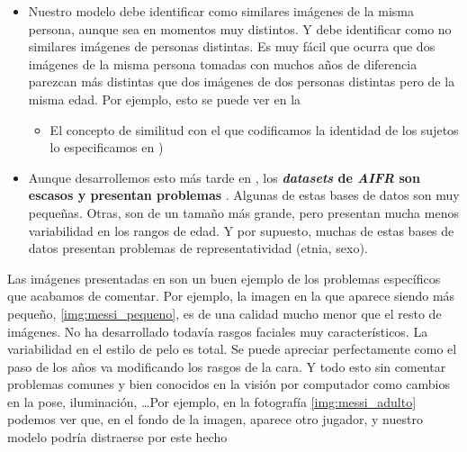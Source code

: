 \begin{itemize}
\item Nuestro modelo debe identificar como similares imágenes de la misma persona, aunque sea en momentos muy distintos. Y debe identificar como no similares imágenes de personas distintas. Es muy fácil que ocurra que dos imágenes de la misma persona tomadas con muchos años de diferencia parezcan más distintas que dos imágenes de dos personas distintas pero de la misma edad. Por ejemplo, esto se puede ver en la 
    \begin{itemize}
        \item El concepto de similitud con el que codificamos la identidad de los sujetos lo especificamos en )
    \end{itemize}
\item Aunque desarrollemos esto más tarde en , los \textbf{\textit{datasets} de \textit{AIFR} son escasos y presentan problemas} \cite{informatica:tecnica_sintesis_aifr}. Algunas de estas bases de datos son muy pequeñas. Otras, son de un tamaño más grande, pero presentan mucha menos variabilidad en los rangos de edad. Y por supuesto, muchas de estas bases de datos presentan problemas de representatividad (etnia, sexo).
\end{itemize}

Las imágenes presentadas en  son un buen ejemplo de los problemas específicos que acabamos de comentar. Por ejemplo, la imagen en la que aparece siendo más pequeño, \ref{img:messi_pequeno}, es de una calidad mucho menor que el resto de imágenes. No ha desarrollado todavía rasgos faciales muy característicos. La variabilidad en el estilo de pelo es total. Se puede apreciar perfectamente como el paso de los años va modificando los rasgos de la cara. Y todo esto sin comentar problemas comunes y bien conocidos en la visión por computador como cambios en la pose, iluminación, \ldots Por ejemplo, en la fotografía \ref{img:messi_adulto} podemos ver que, en el fondo de la imagen, aparece otro jugador, y nuestro modelo podría distraerse por este hecho

